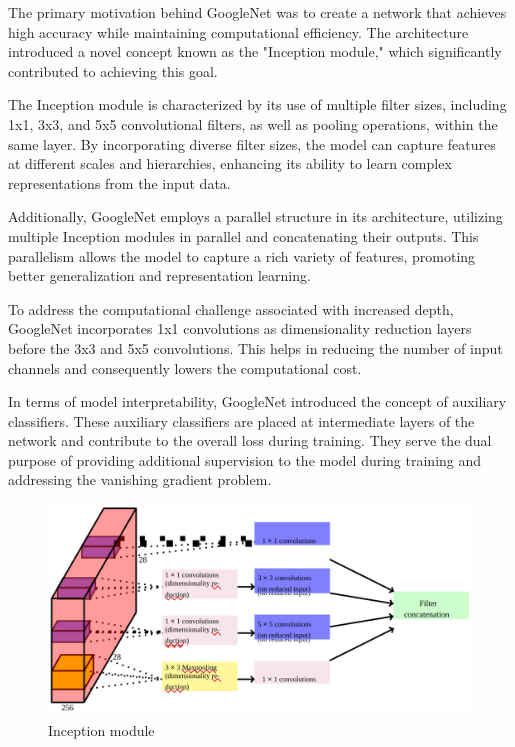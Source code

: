 \documentclass{report}
\begin{document}
The primary motivation behind GoogleNet was to create a network that achieves high accuracy while maintaining computational efficiency. The architecture introduced a novel concept known as the "Inception module," which significantly contributed to achieving this goal.

The Inception module is characterized by its use of multiple filter sizes, including 1x1, 3x3, and 5x5 convolutional filters, as well as pooling operations, within the same layer. By incorporating diverse filter sizes, the model can capture features at different scales and hierarchies, enhancing its ability to learn complex representations from the input data.

Additionally, GoogleNet employs a parallel structure in its architecture, utilizing multiple Inception modules in parallel and concatenating their outputs. This parallelism allows the model to capture a rich variety of features, promoting better generalization and representation learning.

To address the computational challenge associated with increased depth, GoogleNet incorporates 1x1 convolutions as dimensionality reduction layers before the 3x3 and 5x5 convolutions. This helps in reducing the number of input channels and consequently lowers the computational cost.

In terms of model interpretability, GoogleNet introduced the concept of auxiliary classifiers. These auxiliary classifiers are placed at intermediate layers of the network and contribute to the overall loss during training. They serve the dual purpose of providing additional supervision to the model during training and addressing the vanishing gradient problem.


\begin{figure}[ht]
	\includegraphics[width=350pt]{52}
	\centering
	\caption{Inception module}
\end{figure}
\end{document}
